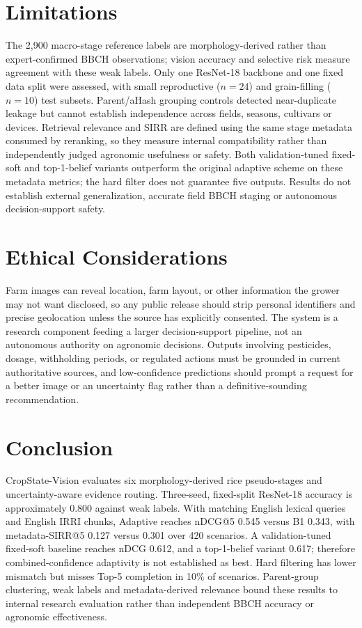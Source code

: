 \documentclass[conference,a4paper]{IEEEtran}
\begin{document}
\section{Limitations}
\label{sec:limitations}
The 2{,}900 macro-stage reference labels are morphology-derived rather than expert-confirmed BBCH observations; vision accuracy and selective risk measure agreement with these weak labels. Only one ResNet-18 backbone and one fixed data split were assessed, with small reproductive ($n=24$) and grain-filling ($n=10$) test subsets. Parent/aHash grouping controls detected near-duplicate leakage but cannot establish independence across fields, seasons, cultivars or devices. Retrieval relevance and SIRR are defined using the same stage metadata consumed by reranking, so they measure internal compatibility rather than independently judged agronomic usefulness or safety. Both validation-tuned fixed-soft and top-1-belief variants outperform the original adaptive scheme on these metadata metrics; the hard filter does not guarantee five outputs. Results do not establish external generalization, accurate field BBCH staging or autonomous decision-support safety.

\section{Ethical Considerations}

Farm images can reveal location, farm layout, or other information the grower may not want disclosed, so any public release should strip personal identifiers and precise geolocation unless the source has explicitly consented. The system is a research component feeding a larger decision-support pipeline, not an autonomous authority on agronomic decisions. Outputs involving pesticides, dosage, withholding periods, or regulated actions must be grounded in current authoritative sources, and low-confidence predictions should prompt a request for a better image or an uncertainty flag rather than a definitive-sounding recommendation.

\section{Conclusion}

CropState-Vision evaluates six morphology-derived rice pseudo-stages and uncertainty-aware evidence routing. Three-seed, fixed-split ResNet-18 accuracy is approximately 0.800 against weak labels. With matching English lexical queries and English IRRI chunks, Adaptive reaches nDCG@5 0.545 versus B1 0.343, with metadata-SIRR@5 0.127 versus 0.301 over 420 scenarios. A validation-tuned fixed-soft baseline reaches nDCG 0.612, and a top-1-belief variant 0.617; therefore combined-confidence adaptivity is not established as best. Hard filtering has lower mismatch but misses Top-5 completion in 10\% of scenarios. Parent-group clustering, weak labels and metadata-derived relevance bound these results to internal research evaluation rather than independent BBCH accuracy or agronomic effectiveness.
\end{document}
